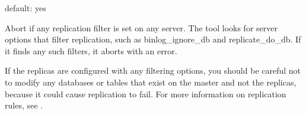 \documentclass[letterpaper,10pt,english]{sphinxmanual}
\begin{document}

\begin{fulllineitems}
\label{\detokenize{mariadb-schema-change:cmdoption-mariadb-schema-change-no-check-replication-filters}}
default: yes

Abort if any replication filter is set on any server.  The tool looks for
server options that filter replication, such as binlog\_ignore\_db and
replicate\_do\_db.  If it finds any such filters, it aborts with an error.

If the replicas are configured with any filtering options, you should be careful
not to modify any databases or tables that exist on the master and not the
replicas, because it could cause replication to fail.  For more information on
replication rules, see .

\end{fulllineitems}

\end{document}
